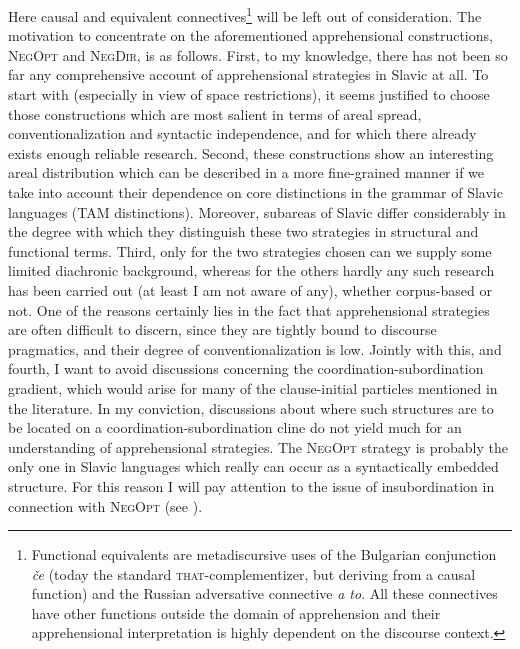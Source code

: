 \documentclass[output=paper,colorlinks,citecolor=brown]{langscibook}
\begin{document}
Here causal and equivalent connectives\footnote{Functional equivalents are metadiscursive uses of the Bulgarian conjunction \textit{če} (today the standard \textsc{that}-complementizer, but deriving from a causal function) and the Russian adversative connective \textit{a to}. All these connectives have other functions outside the domain of apprehension and their apprehensional interpretation is highly dependent on the discourse context.} will be left out of consideration. The motivation to concentrate on the aforementioned apprehensional constructions, \textsc{NegOpt} and \textsc{NegDir}, is as follows. First, to my knowledge, there has not been so far any comprehensive account of apprehensional strategies in Slavic at all. To start with (especially in view of space restrictions), it seems justified to choose those constructions which are most salient in terms of areal spread, conventionalization and syntactic independence, and for which there already exists enough reliable research. Second, these constructions show an interesting areal distribution which can be described in a more fine-grained manner if we take into account their dependence on core distinctions in the grammar of Slavic languages (TAM distinctions). Moreover, subareas of Slavic differ considerably in the degree with which they distinguish these two strategies in structural and functional terms. Third, only for the two strategies chosen can we supply some limited diachronic background, whereas for the others hardly any such research has been carried out (at least I am not aware of any), whether corpus-based or not. One of the reasons certainly lies in the fact that apprehensional strategies are often difficult to discern, since they are tightly bound to discourse pragmatics, and their degree of conventionalization is low. Jointly with this, and fourth, I want to avoid discussions concerning the coordination-subordination gradient, which would arise for many of the clause-initial particles mentioned in the literature. In my conviction, discussions about where such structures are to be located on a coordination-subordination cline do not yield much for an understanding of apprehensional strategies. The \textsc{NegOpt} strategy is probably the only one in Slavic languages which really can occur as a syntactically embedded structure. For this reason I will pay attention to the issue of insubordination in connection with \textsc{NegOpt} (see ).
\end{document}
